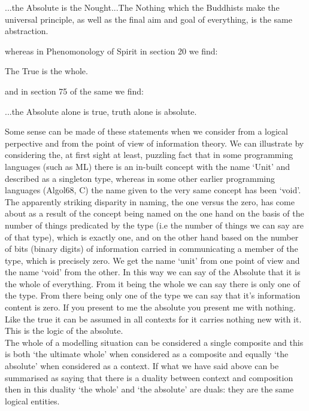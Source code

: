 \begin{erquote}
...the Absolute is the Nought...The Nothing which the Buddhists make the universal principle, as well as the final aim and goal of everything, is the same abstraction.
\end{erquote}

\noindent whereas in Phenomonology of Spirit in section 20 we find:

\begin{erquote}
The True is the whole.
\end{erquote}

\noindent and in section 75 of the same we find:

\begin{erquote}
...the Absolute alone is true, truth alone is absolute.
\end{erquote}
\noindent Some sense can be made of these statements when we consider from a logical perpective and from the point of view of information theory. We can illustrate by considering the, at first sight
at least, puzzling fact that in some programming languages (such as ML) there is an in-built concept with the name `Unit' and described as a singleton type, whereas  in some other earlier programming languages (Algol68, C)  the name given to the very same concept has been `void'. The apparently striking disparity in naming, the one versus the zero, has come  about as a  result of the concept being named on the one hand on the basis of the number of things predicated by the type (i.e the number of things we can say are of that type), which is exactly one, and on the other hand based on the number of bits (binary digits) of information carried in communicating a member of the type, which is precisely zero. We get the name `unit' from one point of view and the name `void' from the other. In this way we can say of the Absolute that it is the whole of everything. From it being the whole we can say there is only one of the type. From there being only one of the type we can say that it's information content is zero. If you present to me the absolute you present me with nothing. Like the true it can be assumed in all contexts for it carries nothing new with it. This is the logic of the absolute. \\

\noindent The whole of a modelling situation can be considered a single composite and this is both `the ultimate whole' when considered as a composite and equally `the absolute' when considered as a context. If what we have said above can be summarised as saying that there is a duality between context and composition then in this duality `the whole' and `the absolute' are duals: they are the same logical entities. \\

